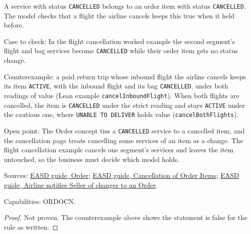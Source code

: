 \begin{theorem}
  \label{thm:airline-change-cancelled-in-active-item}
  A service with status \texttt{CANCELLED} belongs to an order item with
  status \texttt{CANCELLED}.  The model checks that a flight the airline
  cancels keeps this true when it held before.

  Case to check: In the flight cancellation worked example the second
  segment's flight and bag services become \texttt{CANCELLED} while their
  order item gets no status change.

  Counterexample: a paid return trip whose inbound flight the airline
  cancels keeps its item \texttt{ACTIVE}, with the inbound flight and its bag
  \texttt{CANCELLED}, under both readings of value (Lean example
  \texttt{cancelInboundFlight}).  When both flights are cancelled, the item
  is \texttt{CANCELLED} under the strict reading and stays \texttt{ACTIVE}
  under the cautious one, where \texttt{UNABLE TO DELIVER} holds value
  (\texttt{cancelBothFlights}).

  Open point: The Order concept ties a \texttt{CANCELLED} service to a
  cancelled item, and the cancellation page treats cancelling some services
  of an item as a change. The flight cancellation example cancels one
  segment's services and leaves the item untouched, so the business must
  decide which model holds.

  Sources: \href{https://standards.atlassian.net/wiki/spaces/EASD/pages/574849062}{EASD guide, Order};
  \href{https://standards.atlassian.net/wiki/spaces/EASD/pages/574783569}{EASD guide, Cancellation of Order Items};
  \href{https://standards.atlassian.net/wiki/spaces/EASD/pages/815202352}{EASD guide, Airline notifies Seller of changes to an Order}.

  Capabilities: ORDOCN.
\end{theorem}
\begin{proof}
  Not proven.  The counterexample above shows the statement is false for the
  rule as written.
\end{proof}

